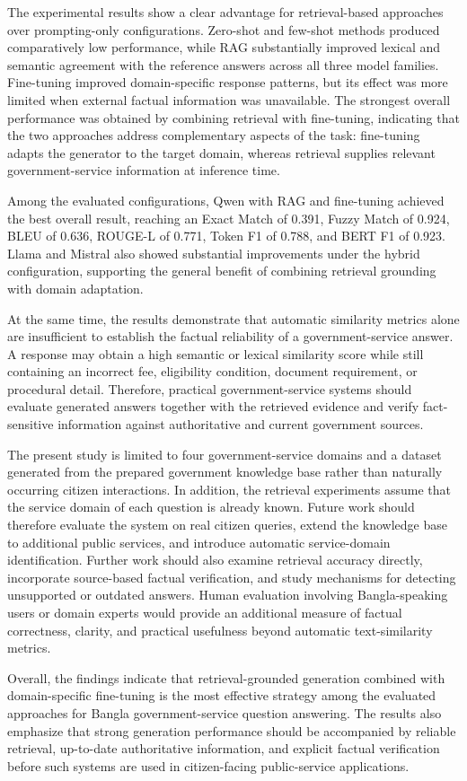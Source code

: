 \documentclass[10pt,journal,compsoc]{IEEEtran}
\begin{document}
The experimental results show a clear advantage for retrieval-based
approaches over prompting-only configurations. Zero-shot and few-shot
methods produced comparatively low performance, while RAG substantially
improved lexical and semantic agreement with the reference answers across
all three model families. Fine-tuning improved domain-specific response
patterns, but its effect was more limited when external factual information
was unavailable. The strongest overall performance was obtained by
combining retrieval with fine-tuning, indicating that the two approaches
address complementary aspects of the task: fine-tuning adapts the
generator to the target domain, whereas retrieval supplies relevant
government-service information at inference time.

Among the evaluated configurations, Qwen with RAG and fine-tuning achieved
the best overall result, reaching an Exact Match of 0.391, Fuzzy Match of
0.924, BLEU of 0.636, ROUGE-L of 0.771, Token F1 of 0.788, and BERT F1 of
0.923. Llama and Mistral also showed substantial improvements under the
hybrid configuration, supporting the general benefit of combining
retrieval grounding with domain adaptation.

At the same time, the results demonstrate that automatic similarity
metrics alone are insufficient to establish the factual reliability of a
government-service answer. A response may obtain a high semantic or
lexical similarity score while still containing an incorrect fee,
eligibility condition, document requirement, or procedural detail.
Therefore, practical government-service systems should evaluate generated
answers together with the retrieved evidence and verify fact-sensitive
information against authoritative and current government sources.

The present study is limited to four government-service domains and a
dataset generated from the prepared government knowledge base rather than
naturally occurring citizen interactions. In addition, the retrieval
experiments assume that the service domain of each question is already
known. Future work should therefore evaluate the system on real citizen
queries, extend the knowledge base to additional public services, and
introduce automatic service-domain identification. Further work should
also examine retrieval accuracy directly, incorporate source-based factual
verification, and study mechanisms for detecting unsupported or outdated
answers. Human evaluation involving Bangla-speaking users or domain
experts would provide an additional measure of factual correctness,
clarity, and practical usefulness beyond automatic text-similarity
metrics.

Overall, the findings indicate that retrieval-grounded generation combined
with domain-specific fine-tuning is the most effective strategy among the
evaluated approaches for Bangla government-service question answering.
The results also emphasize that strong generation performance should be
accompanied by reliable retrieval, up-to-date authoritative information,
and explicit factual verification before such systems are used in
citizen-facing public-service applications.





\end{document}
